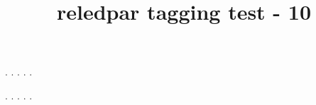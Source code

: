\documentclass[a5paper,11pt]{article}
\title{reledpar tagging test - 10}
\begin{document}
\begin{pages}
    \begin{Leftside}
        \beginnumbering
            . \blindtext[21]
            \pend{}. \blindtext[10]
            \pend{}. \blindtext[6]
            \pend{}. \blindtext[6]
            \pend
            . \blindtext[6]
            \pend
        \endnumbering
    \end{Leftside}
    \begin{Rightside}
        \beginnumbering
            . \blindtext[22]\footnoteAmk
            \pend{}. \blindtext[12]
            \pend{}. \blindtext[12]
            \pend
            . \blindtext[12]
            \pend
            . \blindtext[12]
            \pend
        \endnumbering
    \end{Rightside}
\end{pages}
\Pages
\end{document}
